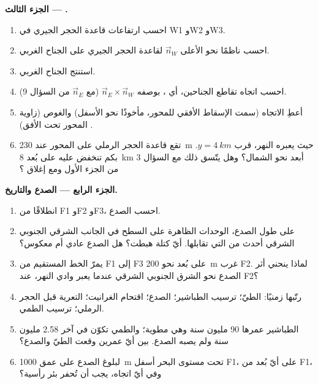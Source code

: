 \begin{problem}
\medskip
\noindent\textbf{الجزء الثالث --- .}
\begin{enumerate}[resume]
  \item احسب ارتفاعات قاعدة الحجر الجيري في W1 وW2 وW3.
  \item احسب ناظمًا نحو الأعلى $\vec n_W$ لقاعدة الحجر الجيري على الجناح الغربي.
  \item استنتج  الجناح الغربي.
  \item احسب اتجاه تقاطع الجناحين، أي ، بوصفه $\vec n_E \times \vec n_W$ (مع $\vec n_E$ من السؤال 9).
  \item أعطِ الاتجاه (سمت الإسقاط الأفقي للمحور، مأخوذًا نحو الأسفل) والغوص (زاوية المحور تحت الأفق) .
  \item تقع قاعدة الحجر الرملي على المحور عند \qty{230}{m} حيث يعبره النهر، قرب $y = \qty{4}{km}$. بكم تنخفض عليه على بُعد \qty{8}{km} أبعد نحو الشمال؟ وهل يتّسق ذلك مع السؤال 3 من الجزء الأول ومع إغلاق ؟
\end{enumerate}

\medskip
\noindent\textbf{الجزء الرابع --- الصدع والتاريخ.}
\begin{enumerate}[resume]
  \item انطلاقًا من F1 وF2 وF3، احسب  الصدع.
  \item على طول الصدع، الوحدات الظاهرة على السطح في الجانب الشرقي الجنوبي الشرقي أحدث من التي تقابلها. أيّ كتلة هبطت؟ هل الصدع عادي أم معكوس؟
  \item يمرّ الخط المستقيم من F1 إلى F3 على بُعد نحو \qty{200}{m} غرب F2. لماذا ينحني أثر الصدع نحو الشرق الجنوبي الشرقي عندما يعبر وادي النهر، عند F2؟
  \item رتّبها زمنيًا: الطيّ؛ ترسيب الطباشير؛ الصدع؛ اقتحام الغرانيت؛ التعرية قبل الحجر الرملي؛ ترسيب الطمي.
  \item الطباشير عمرها 90 مليون سنة وهي مطوية؛ والطمي تكوّن في آخر 2.58 مليون سنة ولم يصبه الصدع. بين أيّ عمرين وقعت الطيّ والصدع؟
  \item لبلوغ الصدع على عمق \qty{1000}{m} تحت مستوى البحر أسفل F1، على أيّ بُعد من F1، وفي أيّ اتجاه، يجب أن تُحفر بئر رأسية؟
\end{enumerate}
\end{problem}
